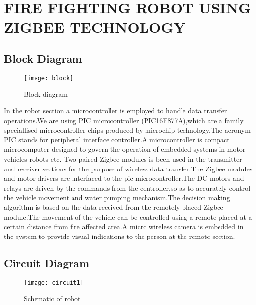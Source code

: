 \documentclass[12pt,a4paper]{report}
\begin{document}
\chapter{{FIRE FIGHTING ROBOT USING ZIGBEE TECHNOLOGY}}

\section{Block Diagram}
\begin{figure}[h!]
\centering
\texttt{[image: block]}
\caption{Block diagram}
\label{circuit}
\end{figure}
\hspace*{1cm} In the robot section a microcontroller is employed to handle data transfer operations.We are using PIC microcontroller (PIC16F877A),which are a family speciallised microcontroller chips produced by microchip technology.The acronym PIC stands for peripheral interface controller.A  microcontroller is compact microcomputer designed to govern the operation of embedded systems in motor vehicles robots etc. 
\hspace*{1cm} Two paired Zigbee modules is been used in the transmitter and receiver sections for the purpose of wireless data transfer.The Zigbee modules and motor drivers are interfaced to the pic microcontroller.The DC motors and relays are driven by the commands from the controller,so as to accurately control the vehicle movement and water pumping mechanism.The decision making algorithm is based on the data received from the remotely placed Zigbee module.The movement of the vehicle can be controlled using a remote placed at a certain distance from fire affected area.A micro wireless camera is embedded in the system to provide visual indications to the person at the remote section. 

\section{Circuit Diagram}
\begin{figure}[h!]
\centering
\texttt{[image: circuit1]}
\caption{Schematic of robot}
\label{circuit}
\end{figure}
\end{document}
